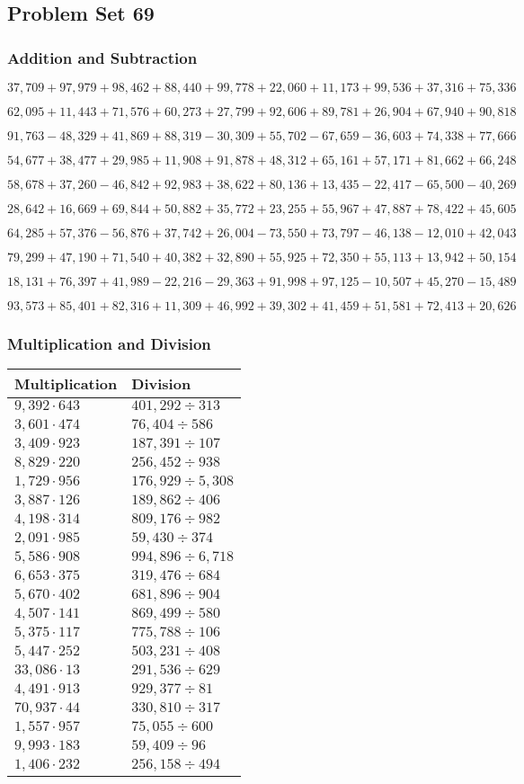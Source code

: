 \hypertarget{problem-set-69}{%
\subsection{Problem Set 69}\label{problem-set-69}}

\hypertarget{addition-and-subtraction-291}{%
\subsubsection{Addition and
Subtraction}\label{addition-and-subtraction-291}}

\(37,709+97,979+98,462+88,440+99,778+22,060+11,173+99,536+37,316+ 75,336\)

\(62,095+11,443+71,576+60,273+27,799+92,606+89,781+26,904+67,940+90,818\)

\(91,763-48,329+41,869+88,319-30,309+55,702-67,659-36,603+74,338+77,666\)

\(54,677+38,477+29,985+11,908+91,878+48,312+65,161+57,171+81,662+66,248\)

\(58,678+37,260-46,842+92,983+38,622+80,136+13,435-22,417-65,500-40,269\)

\(28,642+16,669+69,844+50,882+35,772+23,255+55,967+47,887+78,422+45,605\)

\(64,285+57,376-56,876+37,742+26,004-73,550+73,797-46,138-12,010+42,043\)

\(79,299+47,190+71,540+40,382+32,890+55,925+72,350+55,113+13,942+50,154\)

\(18,131+76,397+41,989-22,216-29,363+91,998+97,125-10,507+45,270-15,489\)

\(93,573+85,401+82,316+11,309+46,992+39,302+41,459+51,581+72,413+20,626\)

\hypertarget{multiplication-and-division-290}{%
\subsubsection{Multiplication and
Division}\label{multiplication-and-division-290}}

\begin{longtable}[]{@{}ll@{}}
\toprule
Multiplication & Division\tabularnewline
\midrule
\endhead
\(9,392\cdot643\) & \(401,292÷313\)\tabularnewline
\(3,601\cdot474\) & \(76,404÷586\)\tabularnewline
\(3,409\cdot923\) & \(187,391÷107\)\tabularnewline
\(8,829\cdot220\) & \(256,452÷938\)\tabularnewline
\(1,729\cdot956\) & \(176,929÷5,308\)\tabularnewline
\(3,887\cdot126\) & \(189,862÷406\)\tabularnewline
\(4,198\cdot314\) & \(809,176÷982\)\tabularnewline
\(2,091\cdot985\) & \(59,430÷374\)\tabularnewline
\(5,586\cdot908\) & \(994,896÷6,718\)\tabularnewline
\(6,653\cdot375\) & \(319,476÷684\)\tabularnewline
\(5,670\cdot402\) & \(681,896÷904\)\tabularnewline
\(4,507\cdot141\) & \(869,499÷580\)\tabularnewline
\(5,375\cdot117\) & \(775,788÷106\)\tabularnewline
\(5,447\cdot252\) & \(503,231÷408\)\tabularnewline
\(33,086\cdot13\) & \(291,536÷629\)\tabularnewline
\(4,491\cdot913\) & \(929,377÷81\)\tabularnewline
\(70,937\cdot44\) & \(330,810÷317\)\tabularnewline
\(1,557\cdot957\) & \(75,055÷600\)\tabularnewline
\(9,993\cdot183\) & \(59,409÷96\)\tabularnewline
\(1,406\cdot232\) & \(256,158÷494\)\tabularnewline
\bottomrule
\end{longtable}

